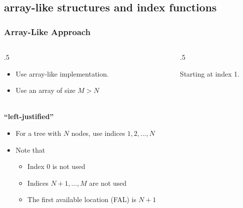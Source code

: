 \documentclass[10pt]{beamer}
\begin{document}
\subsection{array-like structures and index functions}
\begin{frame}[t]\frametitle{Array-Like Approach}

	\begin{columns}[T] %
	\begin{column}{.5\linewidth} %
		
		\begin{itemize}
			\item
			Use array-like implementation.

			\item
			Use an array of size \(M > N\)
		\end{itemize}
			
		\phantom{line} \\
		
		\textbf{``left-justified''}
		
		\begin{itemize}
			
			\item
			For a tree with \( N \) nodes,
			use indices \(1, 2, \dotsc, N \)
			
			\item
			Note that
			\begin{itemize}
	
				\item 
				Index 0 is not used
	
				\item 
				Indices \(N+1, \dotsc, M\) are not used
				
				\item
				The first available location (FAL) is \(N+1\)
	
			\end{itemize}

		\end{itemize}
	\end{column} %
	\begin{column}{.5\linewidth} %
		\begin{example}
		{\footnotesize
		Starting at index 1.
		} %

		{\scriptsize
			
		} %


\end{example}
\end{column}
\end{columns}
\end{frame}
\end{document}
